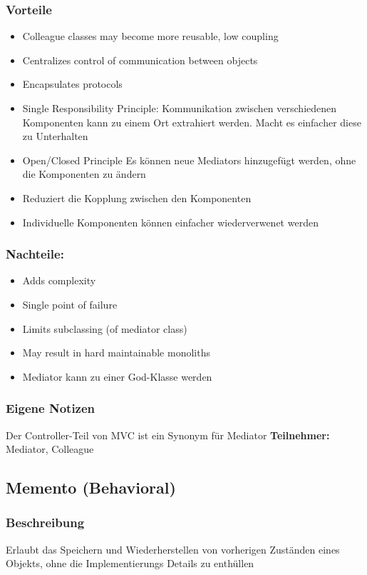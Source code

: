 \subsubsection{Vorteile}
\begin{itemize}[topsep=0pt]
    \itemsep -0.4em
    \item Colleague classes may become more reusable, low coupling
    \item Centralizes control of communication between objects
    \item Encapsulates protocols
    \item Single Responsibility Principle: Kommunikation zwischen verschiedenen Komponenten kann zu einem Ort extrahiert werden. Macht es einfacher diese zu Unterhalten
    \item Open/Closed Principle Es können neue Mediators hinzugefügt werden, ohne die Komponenten zu ändern
    \item Reduziert die Kopplung zwischen den Komponenten
    \item Individuelle Komponenten können einfacher wiederverwenet werden
\end{itemize}
\subsubsection{Nachteile:}
\begin{itemize}[topsep=0pt]
    \itemsep -0.4em
    \item Adds complexity
    \item Single point of failure
    \item Limits subclassing (of mediator class)
    \item May result in hard maintainable monoliths
    \item Mediator kann zu einer God-Klasse werden
\end{itemize}
\subsubsection{Eigene Notizen}
Der Controller-Teil von MVC ist ein Synonym für Mediator
\textbf{Teilnehmer:} Mediator, Colleague

\subsection{Memento (Behavioral)}
\subsubsection{Beschreibung}
Erlaubt das Speichern und Wiederherstellen von vorherigen Zuständen eines Objekts, ohne die Implementierungs Details zu enthüllen
